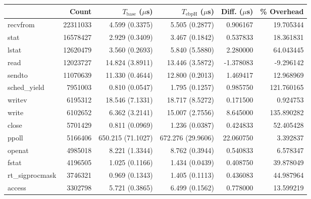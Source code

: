 \begin{tabular}{>{\ttfamily}lrrrrr}
\toprule
\multicolumn{1}{l}{System Call} &     Count & $T_\text{base}$ ($\mu$s) & $T_\text{ebpH}$ ($\mu$s) &  Diff. ($\mu$s) &  \% Overhead \\
\midrule
                       recvfrom &  22311033 &           4.599 (0.3375) &           5.505 (0.2877) &        0.906167 &    19.705344 \\
                           stat &  16578427 &           2.929 (0.3409) &           3.467 (0.1842) &        0.537833 &    18.361831 \\
                          lstat &  12620479 &           3.560 (0.2693) &           5.840 (5.5880) &        2.280000 &    64.043445 \\
                           read &  12023727 &          14.824 (3.8911) &          13.446 (3.5872) &       -1.378083 &    -9.296142 \\
                         sendto &  11070639 &          11.330 (0.4644) &          12.800 (0.2013) &        1.469417 &    12.968969 \\
                    sched_yield &   7951003 &           0.810 (0.0547) &           1.795 (0.1257) &        0.985750 &   121.760165 \\
                         writev &   6195312 &          18.546 (7.1331) &          18.717 (8.5272) &        0.171500 &     0.924753 \\
                          write &   6102652 &           6.362 (3.2141) &          15.007 (2.7556) &        8.645000 &   135.890282 \\
                          close &   5701429 &           0.811 (0.0969) &           1.236 (0.0387) &        0.424833 &    52.405428 \\
                          ppoll &   5166406 &        650.215 (71.1027) &        672.276 (29.9606) &       22.060750 &     3.392837 \\
                         openat &   4985018 &           8.221 (1.3344) &           8.762 (0.3944) &        0.540833 &     6.578347 \\
                          fstat &   4196505 &           1.025 (0.1166) &           1.434 (0.0439) &        0.408750 &    39.878049 \\
                 rt_sigprocmask &   3746321 &           0.969 (0.1343) &           1.405 (0.1113) &        0.436083 &    44.987964 \\
                         access &   3302798 &           5.721 (0.3865) &           6.499 (0.1562) &        0.778000 &    13.599219 \\

\end{tabular}
